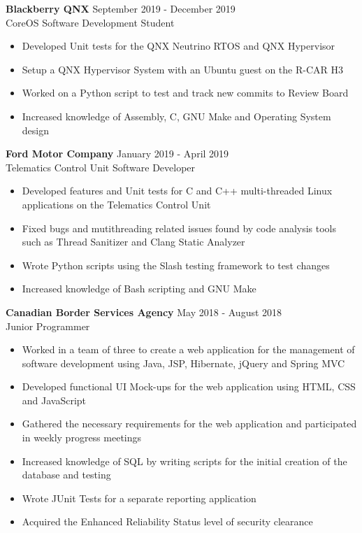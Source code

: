 \documentclass{article}
\begin{document}
\textbf{Blackberry QNX}
\hfill September 2019 - December 2019 \\ CoreOS Software Development Student
\begin{itemize}[noitemsep]
    \item Developed Unit tests for the QNX Neutrino RTOS and QNX Hypervisor
    \item Setup a QNX Hypervisor System with an Ubuntu guest on the R-CAR H3
    \item Worked on a Python script to test and track new commits to Review Board
    \item Increased knowledge of Assembly, C, GNU Make and Operating System design
\end{itemize}

\textbf{Ford Motor Company}
\hfill January 2019 - April 2019 \\ Telematics Control Unit Software Developer
\begin{itemize}[noitemsep]
    \item Developed features and Unit tests for C and C++ multi-threaded Linux applications on the Telematics Control Unit
    \item Fixed bugs and mutithreading related issues found by code analysis tools such as Thread Sanitizer and Clang Static Analyzer
    \item Wrote Python scripts using the Slash testing framework to test changes
    \item Increased knowledge of Bash scripting and GNU Make
\end{itemize}
\newpage

\textbf{Canadian Border Services Agency}
\hfill May 2018 - August 2018 \\ Junior Programmer
\begin{itemize}[noitemsep]
    \item Worked in a team of three to create a web application for the management of software development using Java, JSP, Hibernate, jQuery and Spring MVC
    \item Developed functional UI Mock-ups for the web application using HTML, CSS and JavaScript
    \item Gathered the necessary requirements for the web application and participated in weekly progress meetings
    \item Increased knowledge of SQL by writing scripts for the initial creation of the database and testing
    \item Wrote JUnit Tests for a separate reporting application
    \item Acquired the Enhanced Reliability Status level of security clearance
\end{itemize}
\end{document}
